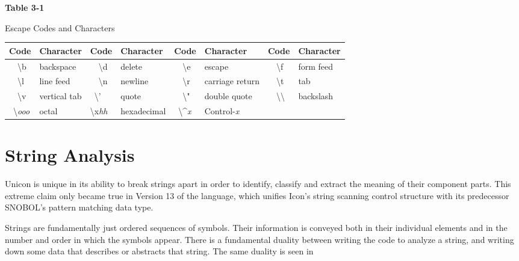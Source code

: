 \medskip

\begin{center}
{\sffamily\bfseries
Table 3-1

Escape Codes and Characters 
}
\end{center}

\begin{center}
\begin{supertabular}{|m{0.38in}|m{0.8in}|m{0.4in}|m{0.855in}|m{0.38in}|m{1.14in}|m{0.38in}|m{0.68in}|}
\hline
\sffamily\bfseries Code &
\sffamily\bfseries Character &
\sffamily\bfseries Code &
\sffamily\bfseries Character &
\sffamily\bfseries Code &
\sffamily\bfseries Character &
\sffamily\bfseries Code &
\sffamily\bfseries Character\\\hline
\ \ {\textbackslash}b &
backspace &
\ \ {\textbackslash}d &
delete &
\ \ {\textbackslash}e &
escape &
\ \ {\textbackslash}f &
form feed\\\hline
\ \ {\textbackslash}l &
line feed &
\ \ {\textbackslash}n &
newline &
\ \ {\textbackslash}r &
carriage return &
\ \ {\textbackslash}t &
tab\\\hline
\ \ {\textbackslash}v &
vertical tab &
\ {\textbackslash}' &
quote &
\ \ {\textbackslash}" &
double quote &
\ \ {\textbackslash}{\textbackslash} &
backslash\\\hline
\ {\textbackslash}\textit{ooo} &
octal &
{\textbackslash}x\textit{hh} &
hexadecimal  &
\ {\textbackslash}\^{}\textit{x} &
Control-\textit{x} &
~
 &
~
\\\hline
\end{supertabular}
\end{center}

\section{String Analysis}

Unicon is unique in its ability to break strings apart in order to
identify, classify and extract the meaning of their component parts.
This extreme claim only became true in Version 13 of the language,
which unifies Icon's string scanning control structure with its
predecessor SNOBOL's pattern matching data type. 

Strings are fundamentally just ordered sequences of symbols. Their
information is conveyed both in their individual elements and in
the number and order in which the symbols appear.
There is a fundamental duality between writing the code to analyze a
string, and writing down some data that describes or abstracts
that string. The same duality is seen in 


